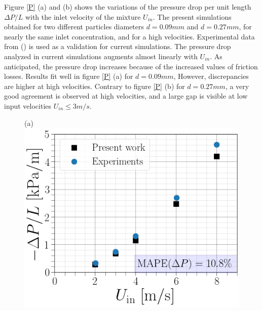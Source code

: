 \documentclass[11pt]{report}
\begin{document}
%
 Figure \ref{P} (a) and (b) shows the variations of the pressure drop per unit length $ \Delta P/L $ with the inlet velocity of the mixture $ U_{in}$. 
 The present simulations obtained for two different particles diameters $d = 0.09 mm$ and $d=0.27 mm$, for nearly the same inlet concentration, and for a high velocities. 
 Experimental data from (\citet {Randal-2004}) is used as a validation for current simulations. 
 The pressure drop analyzed in current simulations augments almost linearly with $ U_{in} $. 
 As anticipated, the pressure drop increases  because of the increased values of friction losses. 
 Results fit well in figure \ref{P} (a) for $d=0.09 mm$, However, discrepancies are higher at high velocities. 
 Contrary to figure \ref{P} (b) for $d= 0.27 mm$, a very good agreement is observed at high velocities, and a large gap is visible at low input velocities $U_{in} \leq 3 m/s$.\\
%
 \begin{figure}[ht!]
 \begin{center}
 (a)\includegraphics[scale = 0.3]{figs/DP009}
 \end{center}
 \end{figure}
%
\end{document}
